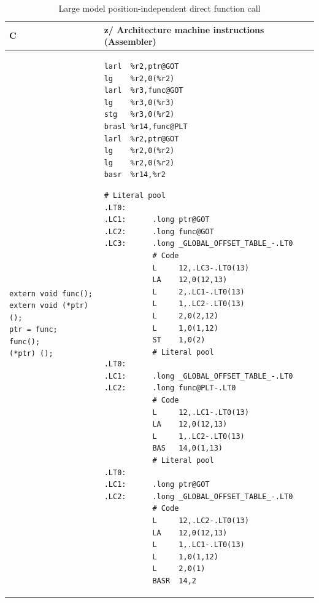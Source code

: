 \documentclass[USenglish,fontsize=11pt,twoside,%
  toc=bib,toc=idx,toc=graduated,numbers=noendperiod,
  bookmarks=true,
  bookmarksnumbered=true,
  bookmarksopen=true,
  bookmarksopenlevel=1,
  breaklinks=true,
  colorlinks=true,
  linkcolor=black,
  pdfpagelayout={TwoPageRight},
  pdfusetitle=true
]{scrreprt}
\newcommand{\ARCH}{z/\kern-1pt Ar\-chi\-tec\-ture}
\newcommand{\ARCH}{ESA/390}
\newenvironment{DIFnomarkup}{}{} %
\begin{document}
\begin{table}
  \centering
  \begin{DIFnomarkup}
  \begin{tabular}{p{}p{}}
    \toprule
    C & \ARCH{} machine instructions (Assembler) \\
    \midrule
\begin{lstlisting}[style=short]
extern void func();
extern void (*ptr)();
ptr = func;
func();
(*ptr) ();
\end{lstlisting}
    &
\ifzseries
\begin{lstlisting}[style=short,language=simpleasm]
larl  %r2,ptr@GOT
lg    %r2,0(%r2)
larl  %r3,func@GOT
lg    %r3,0(%r3)
stg   %r3,0(%r2)
brasl %r14,func@PLT
larl  %r2,ptr@GOT
lg    %r2,0(%r2)
lg    %r2,0(%r2)
basr  %r14,%r2
\end{lstlisting}
\else
\begin{lstlisting}[style=short,language=simpleasm]
           # Literal pool
.LT0:
.LC1:      .long ptr@GOT
.LC2:      .long func@GOT
.LC3:      .long _GLOBAL_OFFSET_TABLE_-.LT0
           # Code
           L     12,.LC3-.LT0(13)
           LA    12,0(12,13)
           L     2,.LC1-.LT0(13)
           L     1,.LC2-.LT0(13)
           L     2,0(2,12)
           L     1,0(1,12)
           ST    1,0(2)
           # Literal pool
.LT0:
.LC1:      .long _GLOBAL_OFFSET_TABLE_-.LT0
.LC2:      .long func@PLT-.LT0
           # Code
           L     12,.LC1-.LT0(13)
           LA    12,0(12,13)
           L     1,.LC2-.LT0(13)
           BAS   14,0(1,13)
           # Literal pool
.LT0:
.LC1:      .long ptr@GOT
.LC2:      .long _GLOBAL_OFFSET_TABLE_-.LT0
           # Code
           L     12,.LC2-.LT0(13)
           LA    12,0(12,13)
           L     1,.LC1-.LT0(13)
           L     1,0(1,12)
           L     2,0(1)
           BASR  14,2
\end{lstlisting}
\fi \\
    \bottomrule
  \end{tabular}
  \end{DIFnomarkup}
  \caption{Large model position-independent {\ifzseries\else direct
      \fi}function call}
  \label{tab:fnlargedirect}
\end{table}
\end{document}

